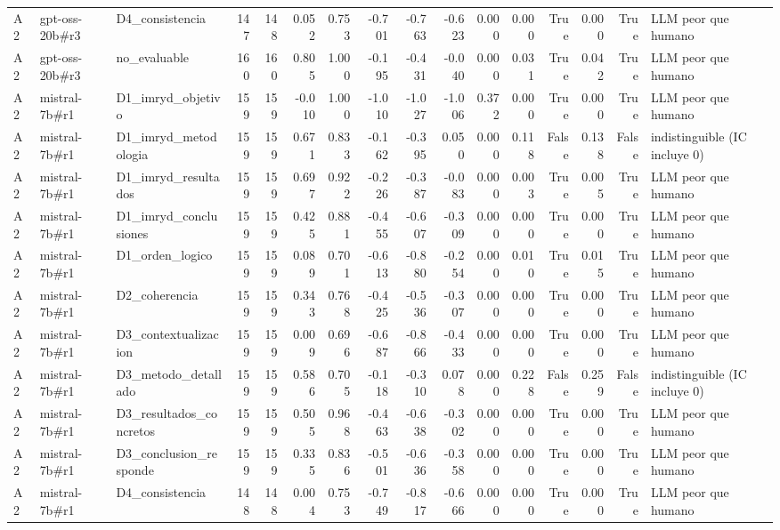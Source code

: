 \begin{table}
{\begin{tabular}{lllrrrrrrrrrrrrl}
A2 & gpt-oss-20b\#r3 & D4\_consistencia & 147 & 148 & 0.052 & 0.753 & -0.701 & -0.763 & -0.623 & 0.000 & 0.000 & True & 0.000 & True & LLM peor que humano \\
A2 & gpt-oss-20b\#r3 & no\_evaluable & 160 & 160 & 0.805 & 1.000 & -0.195 & -0.431 & -0.040 & 0.000 & 0.031 & True & 0.042 & True & LLM peor que humano \\
A2 & mistral-7b\#r1 & D1\_imryd\_objetivo & 159 & 159 & -0.010 & 1.000 & -1.010 & -1.027 & -1.006 & 0.372 & 0.000 & True & 0.000 & True & LLM peor que humano \\
A2 & mistral-7b\#r1 & D1\_imryd\_metodologia & 159 & 159 & 0.671 & 0.833 & -0.162 & -0.395 & 0.050 & 0.000 & 0.118 & False & 0.138 & False & indistinguible (IC incluye 0) \\
A2 & mistral-7b\#r1 & D1\_imryd\_resultados & 159 & 159 & 0.697 & 0.922 & -0.226 & -0.387 & -0.083 & 0.000 & 0.003 & True & 0.005 & True & LLM peor que humano \\
A2 & mistral-7b\#r1 & D1\_imryd\_conclusiones & 159 & 159 & 0.425 & 0.881 & -0.455 & -0.607 & -0.309 & 0.000 & 0.000 & True & 0.000 & True & LLM peor que humano \\
A2 & mistral-7b\#r1 & D1\_orden\_logico & 159 & 159 & 0.089 & 0.701 & -0.613 & -0.880 & -0.254 & 0.000 & 0.010 & True & 0.015 & True & LLM peor que humano \\
A2 & mistral-7b\#r1 & D2\_coherencia & 159 & 159 & 0.343 & 0.768 & -0.425 & -0.536 & -0.307 & 0.000 & 0.000 & True & 0.000 & True & LLM peor que humano \\
A2 & mistral-7b\#r1 & D3\_contextualizacion & 159 & 159 & 0.009 & 0.696 & -0.687 & -0.866 & -0.433 & 0.000 & 0.000 & True & 0.000 & True & LLM peor que humano \\
A2 & mistral-7b\#r1 & D3\_metodo\_detallado & 159 & 159 & 0.586 & 0.705 & -0.118 & -0.310 & 0.078 & 0.000 & 0.228 & False & 0.259 & False & indistinguible (IC incluye 0) \\
A2 & mistral-7b\#r1 & D3\_resultados\_concretos & 159 & 159 & 0.505 & 0.968 & -0.463 & -0.638 & -0.302 & 0.000 & 0.000 & True & 0.000 & True & LLM peor que humano \\
A2 & mistral-7b\#r1 & D3\_conclusion\_responde & 159 & 159 & 0.335 & 0.836 & -0.501 & -0.636 & -0.358 & 0.000 & 0.000 & True & 0.000 & True & LLM peor que humano \\
A2 & mistral-7b\#r1 & D4\_consistencia & 148 & 148 & 0.004 & 0.753 & -0.749 & -0.817 & -0.666 & 0.000 & 0.000 & True & 0.000 & True & LLM peor que humano \\

\end{tabular}}
\end{table}
